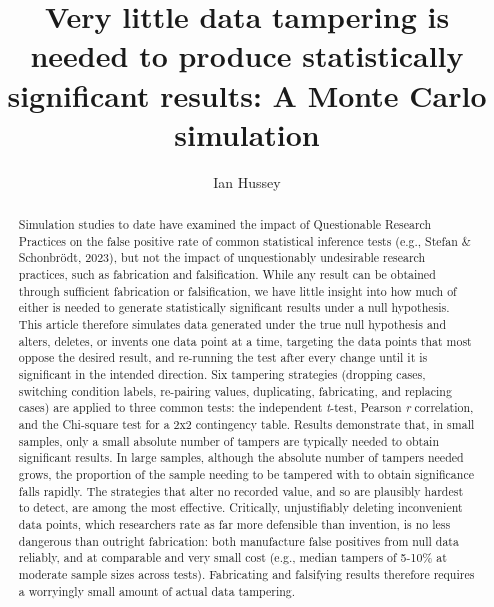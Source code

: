 \documentclass[
  nonatbib,
  authoryear,
  preprint]{elsarticle}
\begin{document}
\begin{frontmatter}
\title{Very little data tampering is needed to produce statistically
significant results: A Monte Carlo simulation}
\author[1]{Ian Hussey%
%
}



        
\begin{abstract}
Simulation studies to date have examined the impact of Questionable
Research Practices on the false positive rate of common statistical
inference tests (e.g., Stefan \& Schonbrödt, 2023), but not the impact
of unquestionably undesirable research practices, such as fabrication
and falsification. While any result can be obtained through sufficient
fabrication or falsification, we have little insight into how much of
either is needed to generate statistically significant results under a
null hypothesis. This article therefore simulates data generated under
the true null hypothesis and alters, deletes, or invents one data point
at a time, targeting the data points that most oppose the desired
result, and re-running the test after every change until it is
significant in the intended direction. Six tampering strategies
(dropping cases, switching condition labels, re-pairing values,
duplicating, fabricating, and replacing cases) are applied to three
common tests: the independent \emph{t}-test, Pearson \emph{r}
correlation, and the Chi-square test for a 2x2 contingency table.
Results demonstrate that, in small samples, only a small absolute number
of tampers are typically needed to obtain significant results. In large
samples, although the absolute number of tampers needed grows, the
proportion of the sample needing to be tampered with to obtain
significance falls rapidly. The strategies that alter no recorded value,
and so are plausibly hardest to detect, are among the most effective.
Critically, unjustifiably deleting inconvenient data points, which
researchers rate as far more defensible than invention, is no less
dangerous than outright fabrication: both manufacture false positives
from null data reliably, and at comparable and very small cost (e.g.,
median tampers of 5-10\% at moderate sample sizes across tests).
Fabricating and falsifying results therefore requires a worryingly small
amount of actual data tampering.
\end{abstract}





\end{frontmatter}
    
\end{document}
